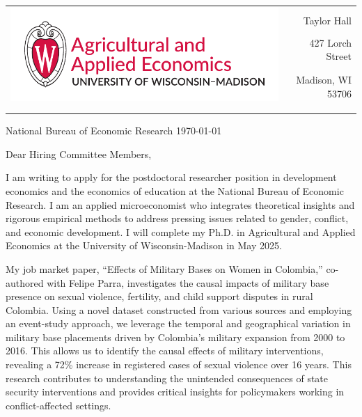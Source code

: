 \documentclass[12pt]{letter}
\begin{document}
\begin{tabularx}{\textwidth}{Xr}
\multirow{4}{*}{\includegraphics[height=3\baselineskip]{logo_cropped.pdf}} &  \\
& Taylor Hall \\
& 427 Lorch Street \\
& Madison, WI 53706 \\
[-1.8ex]\\
\\
\end{tabularx}

National Bureau of Economic Research \hfill \today \\

\medskip

Dear Hiring Committee Members,

I am writing to apply for the postdoctoral researcher position in development economics and the economics of education at the National Bureau of Economic Research. 
I am an applied microeconomist who integrates theoretical insights and rigorous empirical methods to address pressing issues related to gender, conflict, and economic development.
I will complete my Ph.D. in Agricultural and Applied Economics at the University of Wisconsin-Madison in May 2025. 

My job market paper, “Effects of Military Bases on Women in Colombia,” co-authored with Felipe Parra, investigates the causal impacts of military base presence 
on sexual violence, fertility, and child support disputes in rural Colombia. Using a novel dataset constructed from various sources and employing an event-study approach, 
we leverage the temporal and geographical variation in military base placements driven by Colombia's military expansion from 2000 to 2016. This allows us to identify 
the causal effects of military interventions, revealing a 72\% increase in registered cases of sexual violence over 16 years. 
This research contributes to understanding the unintended consequences of state security interventions and provides critical insights 
for policymakers working in conflict-affected settings.
\end{document}
